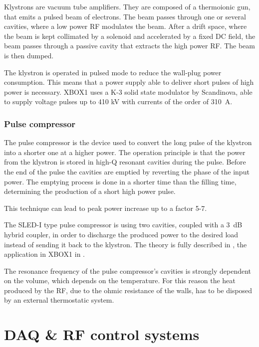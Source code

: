 Klystrons are vacuum tube amplifiers. They are composed of a thermoionic gun, that emits a pulsed beam of electrons. The beam passes through one or several cavities, where a low power RF modulates the beam. After a drift space, where the beam is kept collimated by a solenoid and accelerated by a fixed DC field, the beam passes through a passive cavity that extracts the high power RF. The beam is then dumped. 

The klystron is operated in pulsed mode to reduce the wall-plug power consumption. This means that a power supply able to deliver short pulses of high power is necessary. XBOX1 uses a K-3 solid state modulator by Scandinova, able to supply voltage pulses up to 410 kV with currents of the order of 310~A.


\subsubsection{Pulse compressor}

The pulse compressor is the device used to convert the long pulse of the klystron into a shorter one at a higher power. The operation principle is that the power from the klystron is stored in high-Q resonant cavities during the pulse. Before the end of the pulse the cavities are emptied by reverting the phase of the input power. The emptying process is done in a shorter time than the filling time, determining the production of a short high power pulse. 

This technique can lead to peak power increase up to a factor 5-7. 

The SLED-I type pulse compressor is using two cavities, coupled with a 3~dB hybrid coupler, in order to discharge the produced power to the desired load instead of sending it back to the klystron. The theory is fully described in \cite{Fiebig:209756}, the application in XBOX1 in \cite{SLED:ctf3}.

The resonance frequency of the pulse compressor's cavities is strongly dependent on the volume, which depends on the temperature. For this reason the heat produced by the RF, due to the ohmic resistance of the walls, has to be disposed by an external thermostatic system.

 


\section[DAQ \& RF control systems]{DAQ \& RF control systems}
\label{sec:RF_and_DAQ_s}

